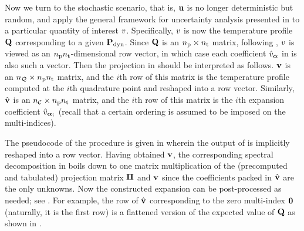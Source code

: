 
Now we turn to the stochastic scenario, that is, $\mathbf{u}$ is no longer deterministic but random, and apply the general framework for uncertainty analysis presented in  to a particular quantity of interest $v$.
Specifically, $v$ is now the temperature profile $\mathbf{Q}$ corresponding to a given $\mathbf{P}_{\text{dyn}}$.
Since $\mathbf{Q}$ is an ${n_\text{p}} \times {n_\text{t}}$ matrix, following , $v$ is viewed as an ${n_\text{p}} {n_\text{t}}$-dimensional row vector, in which case each coefficient $\hat{v}_{\bm{\alpha}}$ in  is also such a vector.
Then the projection in  should be interpreted as follows.
$\mathbf{v}$ is an ${n_\mathcal{Q}} \times {n_\text{p}} {n_\text{t}}$ matrix, and the $i$th row of this matrix is the temperature profile computed at the $i$th quadrature point and reshaped into a row vector.
Similarly, $\hat{\mathbf{v}}$ is an ${n_\mathcal{C}} \times {n_\text{p}} {n_\text{t}}$ matrix, and the $i$th row of this matrix is the $i$th expansion coefficient $\hat{v}_{\bm{\alpha}_i}$ (recall that a certain ordering is assumed to be imposed on the multi-indices).

The pseudocode of the procedure is given in  wherein the output of  is implicitly reshaped into a row vector.
Having obtained $\mathbf{v}$, the corresponding spectral decomposition in  boils down to one matrix multiplication of the (precomputed and tabulated) projection matrix $\bm{\Pi}$ and $\mathbf{v}$ since the coefficients packed in $\hat{\mathbf{v}}$ are the only unknowns.
Now the constructed expansion can be post-processed as needed; see .
For example, the row of $\hat{\mathbf{v}}$ corresponding to the zero multi-index $\mathbf{0}$ (naturally, it is the first row) is a flattened version of the expected value of $\mathbf{Q}$ as shown in .
